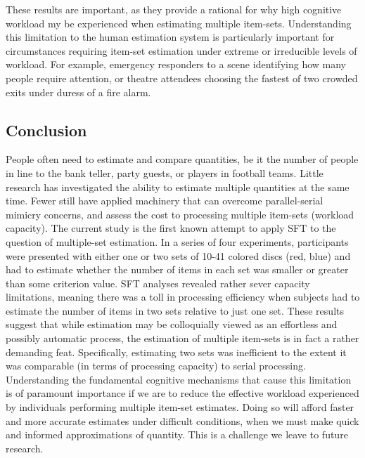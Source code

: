 These results are important, as they provide a rational for why high cognitive workload my be experienced when estimating multiple item-sets. Understanding this limitation to the human estimation system is particularly important for circumstances requiring item-set estimation under extreme or irreducible levels of workload. For example, emergency responders to a scene identifying how many people require attention, or theatre attendees choosing the fastest of two crowded exits under duress of a fire alarm. 

\subsection{Conclusion}
People often need to estimate and compare quantities, be it the number of people in line to the bank teller, party guests, or players in football teams. Little research has investigated the ability to estimate multiple quantities at the same time. Fewer still have applied machinery that can overcome parallel-serial mimicry concerns, and assess the cost to processing multiple item-sets (workload capacity). The current study is the first known attempt to apply SFT to the question of multiple-set estimation. In a series of four experiments, participants were presented with either one or two sets of 10-41 colored discs (red, blue) and had to estimate whether the number of items in each set was smaller or greater than some criterion value. SFT analyses revealed rather sever capacity limitations, meaning there was a toll in processing efficiency when subjects had to estimate the number of items in two sets relative to just one set. These results suggest that while estimation may be colloquially viewed as an effortless and possibly automatic process, the estimation of multiple item-sets is in fact a rather demanding feat. Specifically, estimating two sets was inefficient to the extent it was comparable (in terms of processing capacity) to serial processing. Understanding the fundamental cognitive mechanisms that cause this limitation is of paramount importance if we are to reduce the effective workload experienced by individuals performing multiple item-set estimates. Doing so will afford faster and more accurate estimates under difficult conditions, when we must make quick and informed approximations of quantity. This is a challenge we leave to future research.

